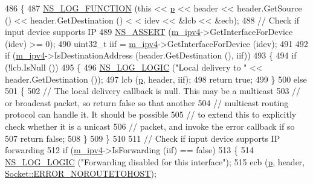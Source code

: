 \begin{DoxyCode}
486 \{ 
487   \hyperlink{log-macros-disabled_8h_a90b90d5bad1f39cb1b64923ea94c0761}{NS\_LOG\_FUNCTION} (\textcolor{keyword}{this} << \hyperlink{lte__link__budget_8m_ac9de518908a968428863f829398a4e62}{p} << header << header.GetSource () << header.GetDestination () <
      < idev << &lcb << &ecb);
488   \textcolor{comment}{// Check if input device supports IP}
489   \hyperlink{assert_8h_a6dccdb0de9b252f60088ce281c49d052}{NS\_ASSERT} (\hyperlink{classns3_1_1Ipv4GlobalRouting_a8ca97d33982a32fa41a98b56dbec2edc}{m\_ipv4}->GetInterfaceForDevice (idev) >= 0);
490   uint32\_t iif = \hyperlink{classns3_1_1Ipv4GlobalRouting_a8ca97d33982a32fa41a98b56dbec2edc}{m\_ipv4}->GetInterfaceForDevice (idev);
491 
492   \textcolor{keywordflow}{if} (\hyperlink{classns3_1_1Ipv4GlobalRouting_a8ca97d33982a32fa41a98b56dbec2edc}{m\_ipv4}->IsDestinationAddress (header.GetDestination (), iif))
493     \{
494       \textcolor{keywordflow}{if} (!lcb.IsNull ())
495         \{
496           \hyperlink{group__logging_ga88acd260151caf2db9c0fc84997f45ce}{NS\_LOG\_LOGIC} (\textcolor{stringliteral}{"Local delivery to "} << header.GetDestination ());
497           lcb (\hyperlink{lte__link__budget_8m_ac9de518908a968428863f829398a4e62}{p}, header, iif);
498           \textcolor{keywordflow}{return} \textcolor{keyword}{true};
499         \}
500       \textcolor{keywordflow}{else}
501         \{
502           \textcolor{comment}{// The local delivery callback is null.  This may be a multicast}
503           \textcolor{comment}{// or broadcast packet, so return false so that another}
504           \textcolor{comment}{// multicast routing protocol can handle it.  It should be possible}
505           \textcolor{comment}{// to extend this to explicitly check whether it is a unicast}
506           \textcolor{comment}{// packet, and invoke the error callback if so}
507           \textcolor{keywordflow}{return} \textcolor{keyword}{false};
508         \}
509     \}
510 
511   \textcolor{comment}{// Check if input device supports IP forwarding}
512   \textcolor{keywordflow}{if} (\hyperlink{classns3_1_1Ipv4GlobalRouting_a8ca97d33982a32fa41a98b56dbec2edc}{m\_ipv4}->IsForwarding (iif) == \textcolor{keyword}{false})
513     \{
514       \hyperlink{group__logging_ga88acd260151caf2db9c0fc84997f45ce}{NS\_LOG\_LOGIC} (\textcolor{stringliteral}{"Forwarding disabled for this interface"});
515       ecb (\hyperlink{lte__link__budget_8m_ac9de518908a968428863f829398a4e62}{p}, header, \hyperlink{classns3_1_1Socket_ada1328c5ae0c28cb2a982caf8f6d6ccaa0f8ecb5a4ddbce3bade35fa12c3d49e8}{Socket::ERROR\_NOROUTETOHOST});

\end{DoxyCode}
